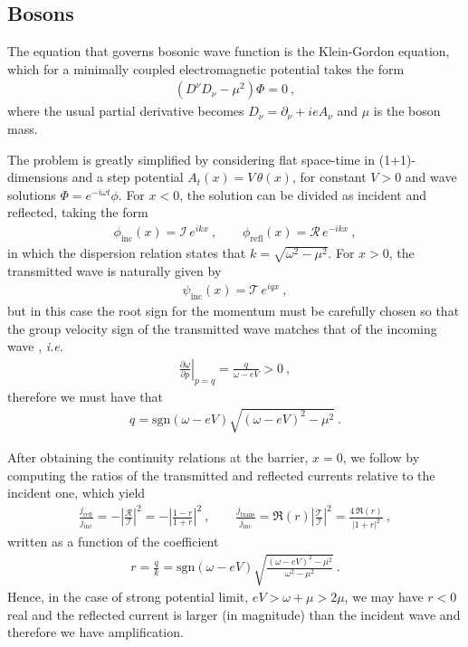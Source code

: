 \subsection{Bosons}

The equation that governs bosonic wave function is the Klein-Gordon equation, which for a minimally coupled electromagnetic potential takes the form
\begin{align}
    (D^\nu D_\nu - \mu^2) \Phi = 0 ~,
    \label{eq1:KleinGordon}
\end{align}
where the usual partial derivative becomes $D_\nu = \partial_\nu + i e A_\nu$ and $\mu$ is the boson mass.

The problem is greatly simplified by considering flat space-time in (1+1)-dimensions and a step potential $A_t(x) = V\,\theta(x)$, for constant $V>0$ and wave solutions $\Phi= e^{-i \omega t} \phi$.
For $x<0$, the solution can be divided as incident and reflected, taking the form
\begin{align}
    \phi_\mathrm{inc}(x) = \mathscr{I}\, e^{i k x}  ~, \qquad
    \phi_\mathrm{refl}(x) = \mathscr{R}\, e^{- i k x} ~,
    \label{eq1:KGsolneg}
\end{align}
in which the dispersion relation states that $k=\sqrt{\omega^2-\mu^2}$. For $x>0$, the transmitted wave is naturally given by 
\begin{align}
    \psi_\mathrm{inc}(x) = \mathscr{T}\, e^{i q x}  ~,
    \label{eq1:KGsolpos}
\end{align}
but in this case the root sign for the momentum must be carefully chosen so that the group velocity sign of the transmitted wave matches that of the incoming wave \cite{Manogue1988}, \textit{i.e.}
\begin{align}
    \left.\frac{\partial \omega}{\partial p}\right|_{p=q} = \frac{q}{\omega - e V} > 0 ~,
    \label{eq1:KGphasev}
\end{align}
therefore we must have that
\begin{align}
    q = \mathrm{sgn}(\omega - e V) \sqrt{ (\omega - e V)^2 - \mu^2 } ~.
    \label{eq1:KGq}
\end{align}

After obtaining the continuity relations at the barrier, $x=0$, we follow by computing the ratios of the transmitted and reflected currents relative to the incident one, which yield
\begin{align}
    \frac{j_\mathrm{refl}}{j_\mathrm{inc}} = - \left|\frac{\mathscr{R}}{\mathscr{I}}\right|^2 = -\left|\frac{1-r}{1+r}\right|^2  ~, \qquad \frac{j_\mathrm{trans}}{j_\mathrm{inc}} = \Re(r) \left|\frac{\mathscr{T}}{\mathscr{I}}\right|^2 = \frac{4\, \Re(r)}{|1+r|^2} ~,
    \label{eq1:KGcurrents}
\end{align}
written as a function of the coefficient 
\begin{align}
    r = \frac{q}{k} = \mathrm{sgn}(\omega - e V)  \sqrt{\frac{(\omega - e V)^2 - \mu^2}{\omega^2 - \mu^2}} ~.
    \label{eq1:KGr}
\end{align}
Hence, in the case of strong potential limit, $e V > \omega + \mu > 2 \mu$, we may have $r<0$ real and the reflected current is larger (in magnitude) than the incident wave and therefore we have amplification.

